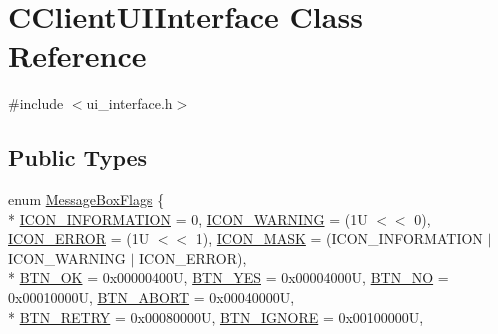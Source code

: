 \hypertarget{class_c_client_u_i_interface}{}\section{C\+Client\+U\+I\+Interface Class Reference}
\label{class_c_client_u_i_interface}


{\ttfamily \#include $<$ui\+\_\+interface.\+h$>$}

\subsection*{Public Types}
\begin{DoxyCompactItemize}
\item 
enum \hyperlink{class_c_client_u_i_interface_a568cf07ecac3fac224d63b42a32e8bc1}{Message\+Box\+Flags} \{ \\*
\hyperlink{class_c_client_u_i_interface_a568cf07ecac3fac224d63b42a32e8bc1a9c1da08e2b3366c89ecf434061c2bf92}{I\+C\+O\+N\+\_\+\+I\+N\+F\+O\+R\+M\+A\+T\+I\+O\+N} = 0, 
\hyperlink{class_c_client_u_i_interface_a568cf07ecac3fac224d63b42a32e8bc1a399d1f571bc91d1eb1abb78c7e9a8426}{I\+C\+O\+N\+\_\+\+W\+A\+R\+N\+I\+N\+G} = (1\+U $<$$<$ 0), 
\hyperlink{class_c_client_u_i_interface_a568cf07ecac3fac224d63b42a32e8bc1a54415d26bda61103f9a08367ff6a2675}{I\+C\+O\+N\+\_\+\+E\+R\+R\+O\+R} = (1\+U $<$$<$ 1), 
\hyperlink{class_c_client_u_i_interface_a568cf07ecac3fac224d63b42a32e8bc1a74ba4315826bb22d61da9aa413894052}{I\+C\+O\+N\+\_\+\+M\+A\+S\+K} = (I\+C\+O\+N\+\_\+\+I\+N\+F\+O\+R\+M\+A\+T\+I\+O\+N $\vert$ I\+C\+O\+N\+\_\+\+W\+A\+R\+N\+I\+N\+G $\vert$ I\+C\+O\+N\+\_\+\+E\+R\+R\+O\+R), 
\\*
\hyperlink{class_c_client_u_i_interface_a568cf07ecac3fac224d63b42a32e8bc1a9874dd49edc70d5c347196ad8a631141}{B\+T\+N\+\_\+\+O\+K} = 0x00000400\+U, 
\hyperlink{class_c_client_u_i_interface_a568cf07ecac3fac224d63b42a32e8bc1a65395b59b20c2bec28beff89cf1ea7b3}{B\+T\+N\+\_\+\+Y\+E\+S} = 0x00004000\+U, 
\hyperlink{class_c_client_u_i_interface_a568cf07ecac3fac224d63b42a32e8bc1abc6f3d18af663a338d9a3a89dd65acaa}{B\+T\+N\+\_\+\+N\+O} = 0x00010000\+U, 
\hyperlink{class_c_client_u_i_interface_a568cf07ecac3fac224d63b42a32e8bc1a111f038c73aecac1e6772fe84ab102f3}{B\+T\+N\+\_\+\+A\+B\+O\+R\+T} = 0x00040000\+U, 
\\*
\hyperlink{class_c_client_u_i_interface_a568cf07ecac3fac224d63b42a32e8bc1af45dfc06c4320e666df48862af00ce8e}{B\+T\+N\+\_\+\+R\+E\+T\+R\+Y} = 0x00080000\+U, 
\hyperlink{class_c_client_u_i_interface_a568cf07ecac3fac224d63b42a32e8bc1a759627c22b14d82cab2c4c66b208865a}{B\+T\+N\+\_\+\+I\+G\+N\+O\+R\+E} = 0x00100000\+U, 

\end{DoxyCompactItemize}

